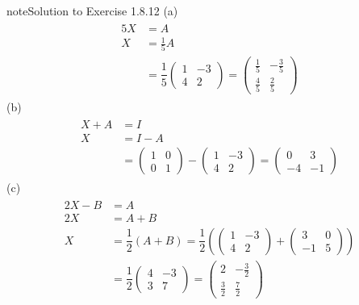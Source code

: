 \documentclass[letterpaper,10pt,english]{jupyterBook}
\begin{document}
\begin{sphinxadmonition}{note}{Solution to Exercise 1.8.12}
\sphinxAtStartPar
(a)
\begin{equation*}
\begin{split} \begin{align*}
    5X &= A \\
    X &= \frac{1}{5} A \\
    &= \dfrac{1}{5}\begin{pmatrix} 1 & -3 \\ 4 & 2 \end{pmatrix} 
    = \begin{pmatrix} \frac{1}{5} & -\frac{3}{5} \\ \frac{4}{5} & \frac{2}{5} \end{pmatrix}
\end{align*} \end{split}
\end{equation*}
\sphinxAtStartPar
(b)
\begin{equation*}
\begin{split} \begin{align*}
    X + A &= I \\
    X &= I - A \\
    &= \begin{pmatrix} 1 & 0 \\ 0 & 1 \end{pmatrix} - \begin{pmatrix} 1 & -3 \\ 4 & 2 \end{pmatrix} = \begin{pmatrix} 0 & 3 \\ -4 & -1 \end{pmatrix}
\end{align*} \end{split}
\end{equation*}
\sphinxAtStartPar
(c)
\begin{equation*}
\begin{split} \begin{align*}
    2X - B &= A \\
    2X &= A + B \\
    X &= \dfrac{1}{2}(A + B) = \dfrac{1}{2}\left( \begin{pmatrix} 1 & -3 \\ 4 & 2 \end{pmatrix} + \begin{pmatrix} 3 & 0 \\ -1 & 5 \end{pmatrix} \right) \\
    &= \dfrac{1}{2} \begin{pmatrix} 4 & -3 \\ 3 & 7 \end{pmatrix} = \begin{pmatrix} 2 & -\frac{3}{2} \\ \frac{3}{2} & \frac{7}{2} \end{pmatrix}

\end{align*}
\end{split}
\end{equation*}
\end{sphinxadmonition}
\end{document}
